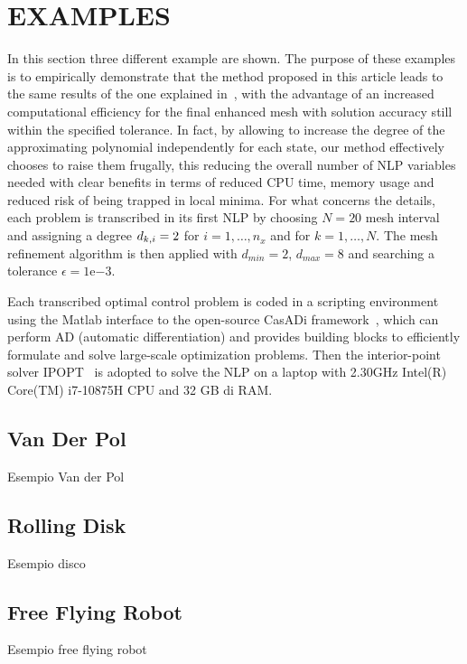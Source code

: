 \section*{EXAMPLES}
In this section three different example are shown. The purpose of these examples is to empirically demonstrate that the method proposed in this article leads to the same results of the one explained in~\cite{Patterson:OCAM:2015}, with the advantage of an increased computational efficiency for the final enhanced mesh with solution accuracy still within the specified tolerance. In fact, by allowing to increase the degree of the approximating polynomial independently for each state, our method effectively chooses to raise them frugally, this reducing the overall number of NLP variables needed with clear benefits in terms of reduced CPU time, memory usage and reduced risk of being trapped in local minima.
For what concerns the details, each problem is transcribed in its first NLP by choosing $N = 20$ mesh interval and assigning a degree $d_{k,i} = 2$ for $i = 1, \dots, n_x$ and for $k = 1, \dots, N$. The mesh refinement algorithm is then applied with $d_{min} = 2$, $d_{max} = 8$ and searching a tolerance $\epsilon = 1\mathrm{e}{-3}$.

Each transcribed optimal control problem is coded in a scripting environment using the
Matlab interface to the open-source CasADi framework~\cite{casadi:MPC:2019}, which can perform AD (automatic differentiation) and provides building blocks to efficiently formulate and solve large-scale optimization problems. Then the interior-point solver IPOPT~\cite{Biegler:CCE:2009} is adopted to solve the NLP on a laptop with 2.30GHz Intel(R) Core(TM) i7-10875H CPU and 32 GB di RAM.


\subsection*{Van Der Pol}
Esempio Van der Pol

\subsection*{Rolling Disk}
Esempio disco

\subsection*{Free Flying Robot}
Esempio free flying robot

